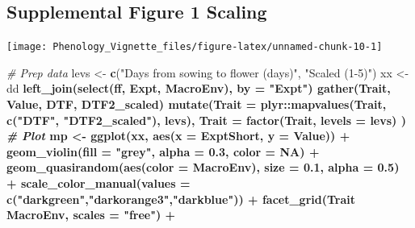 \documentclass[
]{article}
\newenvironment{Shaded}{\begin{snugshade}}{\end{snugshade}}
\newcommand{\CommentTok}[1]{\textcolor[rgb]{0.56,0.35,0.01}{\textit{#1}}}
\newcommand{\DataTypeTok}[1]{\textcolor[rgb]{0.13,0.29,0.53}{#1}}
\newcommand{\FloatTok}[1]{\textcolor[rgb]{0.00,0.00,0.81}{#1}}
\newcommand{\KeywordTok}[1]{\textcolor[rgb]{0.13,0.29,0.53}{\textbf{#1}}}
\newcommand{\NormalTok}[1]{#1}
\newcommand{\OperatorTok}[1]{\textcolor[rgb]{0.81,0.36,0.00}{\textbf{#1}}}
\newcommand{\OtherTok}[1]{\textcolor[rgb]{0.56,0.35,0.01}{#1}}
\newcommand{\StringTok}[1]{\textcolor[rgb]{0.31,0.60,0.02}{#1}}
\begin{document}
\hypertarget{supplemental-figure-1-scaling}{%
\subsection{Supplemental Figure 1
Scaling}\label{supplemental-figure-1-scaling}}

\texttt{[image: Phenology\_Vignette\_files/figure-latex/unnamed-chunk-10-1]}

\begin{Shaded}
\begin{Highlighting}[]
\CommentTok{# Prep data}
\NormalTok{levs <-}\StringTok{ }\KeywordTok{c}\NormalTok{(}\StringTok{"Days from sowing to flower (days)"}\NormalTok{, }\StringTok{"Scaled (1-5)"}\NormalTok{)}
\NormalTok{xx <-}\StringTok{ }\NormalTok{dd }\OperatorTok{%
\StringTok{  }\KeywordTok{left_join}\NormalTok{(}\KeywordTok{select}\NormalTok{(ff, Expt, MacroEnv), }\DataTypeTok{by =} \StringTok{"Expt"}\NormalTok{) }\OperatorTok{%
\StringTok{  }\KeywordTok{gather}\NormalTok{(Trait, Value, DTF, DTF2_scaled) }\OperatorTok{%
\StringTok{  }\KeywordTok{mutate}\NormalTok{(}\DataTypeTok{Trait =}\NormalTok{ plyr}\OperatorTok{::}\KeywordTok{mapvalues}\NormalTok{(Trait, }\KeywordTok{c}\NormalTok{(}\StringTok{"DTF"}\NormalTok{, }\StringTok{"DTF2_scaled"}\NormalTok{), levs),}
         \DataTypeTok{Trait =} \KeywordTok{factor}\NormalTok{(Trait, }\DataTypeTok{levels =}\NormalTok{ levs) )}
\CommentTok{# Plot}
\NormalTok{mp <-}\StringTok{ }\KeywordTok{ggplot}\NormalTok{(xx, }\KeywordTok{aes}\NormalTok{(}\DataTypeTok{x =}\NormalTok{ ExptShort, }\DataTypeTok{y =}\NormalTok{ Value)) }\OperatorTok{+}\StringTok{ }
\StringTok{  }\KeywordTok{geom_violin}\NormalTok{(}\DataTypeTok{fill =} \StringTok{"grey"}\NormalTok{, }\DataTypeTok{alpha =} \FloatTok{0.3}\NormalTok{, }\DataTypeTok{color =} \OtherTok{NA}\NormalTok{) }\OperatorTok{+}\StringTok{ }
\StringTok{  }\KeywordTok{geom_quasirandom}\NormalTok{(}\KeywordTok{aes}\NormalTok{(}\DataTypeTok{color =}\NormalTok{ MacroEnv), }\DataTypeTok{size =} \FloatTok{0.1}\NormalTok{, }\DataTypeTok{alpha =} \FloatTok{0.5}\NormalTok{) }\OperatorTok{+}
\StringTok{  }\KeywordTok{scale_color_manual}\NormalTok{(}\DataTypeTok{values =} \KeywordTok{c}\NormalTok{(}\StringTok{"darkgreen"}\NormalTok{,}\StringTok{"darkorange3"}\NormalTok{,}\StringTok{"darkblue"}\NormalTok{)) }\OperatorTok{+}
\StringTok{  }\KeywordTok{facet_grid}\NormalTok{(Trait }\OperatorTok{~}\StringTok{ }\NormalTok{MacroEnv, }\DataTypeTok{scales =} \StringTok{"free"}\NormalTok{) }\OperatorTok{+}\StringTok{ }
}}}
\end{Highlighting}
\end{Shaded}
\end{document}
